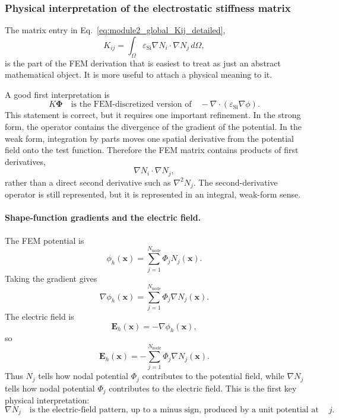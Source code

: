 \documentclass[11pt]{article}
\newcommand{\Evec}{\mathbf{E}}
\begin{document}
\subsubsection{Physical interpretation of the electrostatic stiffness matrix}

The matrix entry in Eq.~\eqref{eq:module2_global_Kij_detailed},
\begin{equation}
K_{ij}
= \int_{\Omega} \varepsilon_{\mathrm{Si}} \nabla N_i \cdot \nabla N_j \, d\Omega,
\end{equation}
is the part of the FEM derivation that is easiest to treat as just an abstract mathematical object. It is more useful to attach a physical meaning to it.

A good first interpretation is
\begin{equation}
\boxed{
K\bm{\Phi}
\quad \text{is the FEM-discretized version of} \quad
-\nabla \cdot \left(\varepsilon_{\mathrm{Si}} \nabla \phi\right).
}
\end{equation}
This statement is correct, but it requires one important refinement. In the strong form, the operator contains the divergence of the gradient of the potential. In the weak form, integration by parts moves one spatial derivative from the potential field onto the test function. Therefore the FEM matrix contains products of first derivatives,
\begin{equation}
\nabla N_i \cdot \nabla N_j,
\end{equation}
rather than a direct second derivative such as $\nabla^2 N_j$. The second-derivative operator is still represented, but it is represented in an integral, weak-form sense.

\paragraph{Shape-function gradients and the electric field.}
The FEM potential is
\begin{equation}
\phi_h(\mathbf{x})
= \sum_{j=1}^{N_{\mathrm{node}}} \Phi_j N_j(\mathbf{x}).
\end{equation}
Taking the gradient gives
\begin{equation}
\nabla \phi_h(\mathbf{x})
= \sum_{j=1}^{N_{\mathrm{node}}} \Phi_j \nabla N_j(\mathbf{x}).
\end{equation}
The electric field is
\begin{equation}
\Evec_h(\mathbf{x})
= -\nabla \phi_h(\mathbf{x}),
\end{equation}
so
\begin{equation}
\Evec_h(\mathbf{x})
= -\sum_{j=1}^{N_{\mathrm{node}}} \Phi_j \nabla N_j(\mathbf{x}).
\end{equation}
Thus $N_j$ tells how nodal potential $\Phi_j$ contributes to the potential field, while $\nabla N_j$ tells how nodal potential $\Phi_j$ contributes to the electric field. This is the first key physical interpretation:
\begin{equation}
\boxed{
\nabla N_j
\quad \text{is the electric-field pattern, up to a minus sign, produced by a unit potential at node } j.
}
\end{equation}
\end{document}
